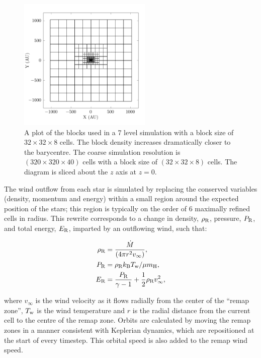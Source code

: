 \begin{figure}
  \centering
  \includegraphics[width=2.5in]{assets/mesh/gridxy.pdf}
  \caption[Static mesh refinement example]{A plot of the blocks used in a 7 level simulation with a block size of $32\times 32 \times 8$ cells. The block density increases dramatically closer to the barycentre. The coarse simulation resolution is $(320\times 320\times 40)$ cells with a block size of $(32\times32\times8)$ cells. The diagram is sliced about the $z$ axis at $z=0$.}
  \label{fig:smr-grid}
\end{figure}

The wind outflow from each star is simulated by replacing the conserved variables (density, momentum and energy) within a small region around the expected position of the stars; this region is typically on the order of 6 maximally refined cells in radius.
This rewrite corresponds to a change in density, $\rho _\text{R}$, pressure, $P _\text{R}$, and total energy, $E _\text{R}$, imparted by an outflowing wind, such that:

\begin{subequations}
  \begin{align}
    \rho _\text{R} & = \frac{\dot M}{(4 \pi r^2 v_\infty)} , \\
    P _\text{R}    & = \rho _\text{R} k _\text{B} T _\text{w} / \mu m _\text{H} , \\
    E_\text{R}   &  = \frac{P _\text{R}}{\gamma - 1} + \frac{1}{2} \rho _\text{R} v_\infty^2 ,
  \end{align}
\end{subequations}

\noindent
where $v_\infty$ is the wind velocity as it flows radially from the center of the ``remap zone'', $T _\text{w}$ is the wind temperature and $r$ is the radial distance from the current cell to the centre of the remap zone.
Orbits are calculated by moving the remap zones in a manner consistent with Keplerian dynamics, which are repositioned at the start of every timestep.
This orbital speed is also added to the remap wind speed.

